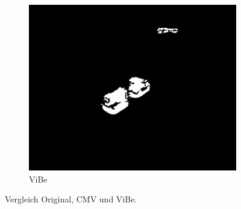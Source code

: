 \documentclass[]{scrartcl}
\begin{document}
\begin{figure}[h!]
\begin{subfigure}{.33\textwidth}
  \includegraphics[width=.95\linewidth]{Seg_S21-2_0120-VIBE.jpeg}
  \caption{ViBe}
  \label{fig:comp_vibe}
\end{subfigure}
\caption{Vergleich Original, CMV und ViBe.}
\label{fig:comp}
\end{figure}
\end{document}
